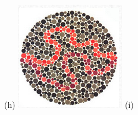\documentclass[	12pt, Times, openright, twoside, a4paper, english, brazil]{abntex2}
\begin{document}
\begin{apendicesenv}
\begin{figure}[!htb]
(h)
\endminipage\hfill
{}
\centering
{\includegraphics[width=\linewidth]{ishihara-transformacao/figureIshihara26.png}}
(i)
\endminipage\hfill


\end{figure}
\end{apendicesenv}
\end{document}
